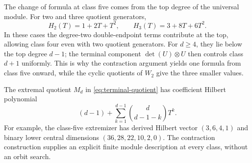 The change of formula at class five comes from the top degree of the
universal module. For two and three quotient generators,
\[
 H_2(T)=1+2T+T^2,\qquad H_3(T)=3+8T+6T^2.
\]
In these cases the degree-two double-endpoint terms contribute at the
top, allowing class four even with two quotient generators. For
\(d\ge4\), they lie below the top degree \(d-1\); the terminal component
\(\det(U)\otimes U\) then controls class \(d+1\) uniformly. This is why
the contraction argument yields one formula from class five onward,
while the cyclic quotients of \(W_2\) give the three smaller values.

The extremal quotient \(M_d\) in \eqref{eq:terminal-quotient} has
coefficient Hilbert polynomial
\[
 (d-1)+\sum_{k=1}^{d-1}\binom d{d-1-k}T^k.
\]
For example, the class-five extremizer has derived Hilbert vector
\((3,6,4,1)\) and binary lower central dimensions
\((36,28,22,10,2,0)\).
The contraction construction supplies an explicit finite module
description at every class, without an orbit search.
